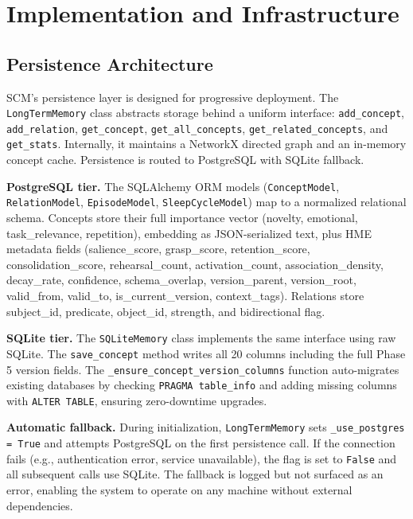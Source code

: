 \documentclass[11pt,twocolumn]{article}
\begin{document}
\section{Implementation and Infrastructure}

\subsection{Persistence Architecture}

SCM's persistence layer is designed for progressive deployment. The \texttt{LongTermMemory} class abstracts storage behind a uniform interface: \texttt{add\_concept}, \texttt{add\_relation}, \texttt{get\_concept}, \texttt{get\_all\_concepts}, \texttt{get\_related\_concepts}, and \texttt{get\_stats}. Internally, it maintains a NetworkX directed graph and an in-memory concept cache. Persistence is routed to PostgreSQL with SQLite fallback.

\textbf{PostgreSQL tier.} The SQLAlchemy ORM models (\texttt{ConceptModel}, \texttt{RelationModel}, \texttt{EpisodeModel}, \texttt{SleepCycleModel}) map to a normalized relational schema. Concepts store their full importance vector (novelty, emotional, task\_relevance, repetition), embedding as JSON-serialized text, plus HME metadata fields (salience\_score, grasp\_score, retention\_score, consolidation\_score, rehearsal\_count, activation\_count, association\_density, decay\_rate, confidence, schema\_overlap, version\_parent, version\_root, valid\_from, valid\_to, is\_current\_version, context\_tags). Relations store subject\_id, predicate, object\_id, strength, and bidirectional flag.

\textbf{SQLite tier.} The \texttt{SQLiteMemory} class implements the same interface using raw SQLite. The \texttt{save\_concept} method writes all 20 columns including the full Phase 5 version fields. The \texttt{\_ensure\_concept\_version\_columns} function auto-migrates existing databases by checking \texttt{PRAGMA table\_info} and adding missing columns with \texttt{ALTER TABLE}, ensuring zero-downtime upgrades.

\textbf{Automatic fallback.} During initialization, \texttt{LongTermMemory} sets \texttt{\_use\_postgres = True} and attempts PostgreSQL on the first persistence call. If the connection fails (e.g., authentication error, service unavailable), the flag is set to \texttt{False} and all subsequent calls use SQLite. The fallback is logged but not surfaced as an error, enabling the system to operate on any machine without external dependencies.
\end{document}
